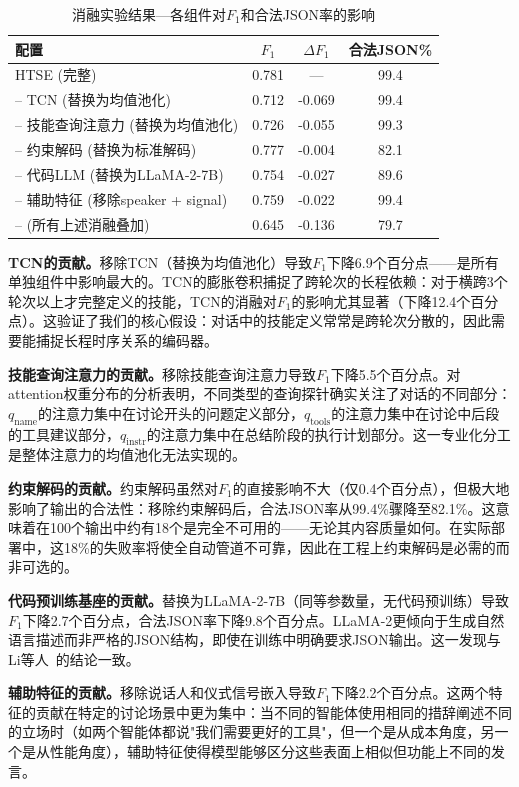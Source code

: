 \documentclass[conference]{IEEEtran}
\begin{document}
\begin{table}[t]
\centering
\caption{消融实验结果—各组件对$F_1$和合法JSON率的影响}
\label{tab:ablation}
\setlength{\tabcolsep}{3pt}
\begin{tabular}{lccc}
\toprule
配置 & $F_1$ & $\Delta F_1$ & 合法JSON\% \\
\midrule
HTSE (完整) & 0.781 & --- & 99.4 \\
--  TCN (替换为均值池化) & 0.712 & -0.069 & 99.4 \\
--  技能查询注意力 (替换为均值池化) & 0.726 & -0.055 & 99.3 \\
--  约束解码 (替换为标准解码) & 0.777 & -0.004 & 82.1 \\
--  代码LLM (替换为LLaMA-2-7B) & 0.754 & -0.027 & 89.6 \\
--  辅助特征 (移除speaker + signal) & 0.759 & -0.022 & 99.4 \\
--  (所有上述消融叠加) & 0.645 & -0.136 & 79.7 \\
\bottomrule
\end{tabular}
\end{table}

\textbf{TCN的贡献。}移除TCN（替换为均值池化）导致$F_1$下降6.9个百分点——是所有单独组件中影响最大的。TCN的膨胀卷积捕捉了跨轮次的长程依赖：对于横跨3个轮次以上才完整定义的技能，TCN的消融对$F_1$的影响尤其显著（下降12.4个百分点）。这验证了我们的核心假设：对话中的技能定义常常是跨轮次分散的，因此需要能捕捉长程时序关系的编码器。

\textbf{技能查询注意力的贡献。}移除技能查询注意力导致$F_1$下降5.5个百分点。对attention权重分布的分析表明，不同类型的查询探针确实关注了对话的不同部分：$q_{\mathrm{name}}$的注意力集中在讨论开头的问题定义部分，$q_{\mathrm{tools}}$的注意力集中在讨论中后段的工具建议部分，$q_{\mathrm{instr}}$的注意力集中在总结阶段的执行计划部分。这一专业化分工是整体注意力的均值池化无法实现的。

\textbf{约束解码的贡献。}约束解码虽然对$F_1$的直接影响不大（仅0.4个百分点），但极大地影响了输出的合法性：移除约束解码后，合法JSON率从99.4\%骤降至82.1\%。这意味着在100个输出中约有18个是完全不可用的——无论其内容质量如何。在实际部署中，这18\%的失败率将使全自动管道不可靠，因此在工程上约束解码是必需的而非可选的。

\textbf{代码预训练基座的贡献。}替换为LLaMA-2-7B（同等参数量，无代码预训练）导致$F_1$下降2.7个百分点，合法JSON率下降9.8个百分点。LLaMA-2更倾向于生成自然语言描述而非严格的JSON结构，即使在训练中明确要求JSON输出。这一发现与Li等人~\cite{li2024knowcoder}的结论一致。

\textbf{辅助特征的贡献。}移除说话人和仪式信号嵌入导致$F_1$下降2.2个百分点。这两个特征的贡献在特定的讨论场景中更为集中：当不同的智能体使用相同的措辞阐述不同的立场时（如两个智能体都说"我们需要更好的工具"，但一个是从成本角度，另一个是从性能角度），辅助特征使得模型能够区分这些表面上相似但功能上不同的发言。
\end{document}
